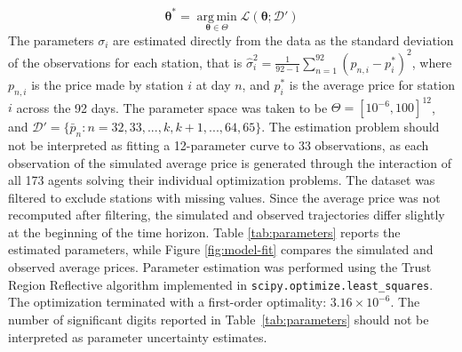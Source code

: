 \documentclass[graybox]{svmult}
\begin{document}
\begin{equation}
\label{eq:theta*}
    \boldsymbol{\theta^*}=\operatorname*{arg\,min}_{\boldsymbol{\theta}\in\Theta} \mathcal{L}(\boldsymbol{\theta};\mathcal{D}')
\end{equation}
 The parameters $\sigma_i$ are estimated directly from the data as the standard deviation of the observations for each station, that is $\hat{\sigma}^2_i=\frac{1}{92-1} \sum_{n=1}^{92}(p_{n,i}-{p}_i^*)^2$, where $p_{n,i}$ is the price made by station $i$ at day $n$, and ${p}_i^*$ is the average price for station $i$ across the 92 days.  The parameter space was taken to be $\Theta=[10^{-6},100]^{12}$, and $\mathcal{D}'=\{\bar{p}_n:n=32,33,...,k,k+1,...,64,65\}$. The estimation problem should not be interpreted as fitting a 12-parameter curve to 33 observations, as each observation of the simulated average price is generated through the interaction of all 173 agents solving their individual optimization problems. %
 The dataset was filtered to exclude stations with missing values. Since the average price was not recomputed after filtering, the simulated and observed trajectories differ slightly at the beginning of the time horizon. Table \ref{tab:parameters} reports the estimated parameters, while Figure \ref{fig:model-fit} compares the simulated and observed average prices. Parameter estimation was performed using the Trust Region Reflective algorithm implemented in \texttt{scipy.optimize.least\_squares}. %
 The optimization terminated with a first-order optimality: $3.16 \times 10^{-6}$. The number of significant digits reported in Table~\ref{tab:parameters} should not be interpreted as parameter uncertainty estimates.
 
\end{document}
